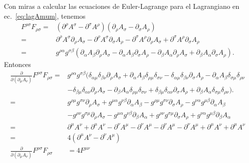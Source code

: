 \begin{frame}
Con miras a calcular  las ecuaciones de Euler-Lagrange para el Lagrangiano en
ec.~\eqref{eq:lagAmum}, tenemos
\begin{align}
F^{\rho\sigma}F_{\rho\sigma}=&(\partial^\rho A^\sigma-\partial^\sigma A^\rho)(\partial_\rho A_\sigma-\partial_\sigma A_\rho)\nonumber\\
=&\partial^\rho A^\sigma\partial_\rho A_\sigma-\partial^\rho A^\sigma\partial_\sigma A_\rho-\partial^\sigma A^\rho\partial_\rho A_\sigma+\partial^\sigma A^\rho\partial_\sigma
A_\rho\nonumber\\
=&g^{\rho\alpha}g^{\sigma\beta}(\partial_\alpha A_\beta\partial_\rho A_\sigma-\partial_\alpha A_\beta\partial_\sigma A_\rho-\partial_\beta A_\alpha\partial_\rho A_\sigma+\partial_\beta A_\alpha\partial_\sigma A_\rho).\nonumber
\end{align}
Entonces
\begin{align}
  \frac{\partial}{\partial(\partial_\mu A_\nu)}F^{\rho\sigma}F_{\rho\sigma}=&g^{\rho\alpha}g^{\sigma\beta}(\delta_{\alpha\mu}\delta_{\beta\nu}\partial_\rho
  A_\sigma+\partial_\alpha A_\beta\delta_{\rho\mu} \delta_{\sigma\nu}-\delta_{\alpha\mu}\delta_{\beta\nu}\partial_\sigma A_\rho-\partial_\alpha A_\beta\delta_{\sigma\mu}\delta_{\rho\nu}\nonumber\\
&-\delta_{\beta\mu}\delta_{\alpha\nu}\partial_\rho A_\sigma-\partial_\beta A_\alpha\delta_{\rho\mu}\delta_{\sigma\nu}+\delta_{\beta\mu}\delta_{\alpha\nu}\partial_\sigma A_\rho+\partial_\beta
A_\alpha\delta_{\sigma\mu}\delta_{\rho\nu}).\nonumber\\
=&  g^{\rho\mu}g^{\sigma\nu}\partial_\rho A_\sigma+g^{\mu\alpha}g^{\nu\beta}\partial_\alpha A_\beta-g^{\rho\mu}g^{\sigma\nu}\partial_\sigma A_\rho-g^{\nu\alpha}g^{\mu\beta}\partial_\alpha A_\beta\nonumber\\
 &-g^{\rho\nu}g^{\sigma\mu}\partial_\rho A_\sigma-g^{\mu\alpha}g^{\nu\beta}\partial_\beta A_\alpha+g^{\rho\nu}g^{\sigma\mu}\partial_\sigma A_\rho+g^{\nu\alpha}g^{\mu\beta}\partial_\beta A_\alpha\nonumber\\
=&  \partial^\mu A^\nu+\partial^\mu A^\nu-\partial^\nu A^\mu-\partial^\nu A^\mu-\partial^\nu A^\mu-\partial^\nu A^\mu+\partial^\mu A^\nu+\partial^\mu A^\nu\nonumber\\
=&4(\partial^\mu A^\nu-\partial^\nu A^\mu) \nonumber\\
\label{eq:dddmufmunu2}
\frac{\partial}{\partial(\partial_\mu A_\nu)}F^{\rho\sigma}F_{\rho\sigma}&=4F^{\mu\nu}
\end{align}


\end{frame}
